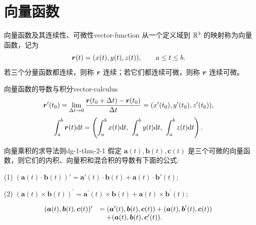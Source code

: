 \section{向量函数}

\begin{definition}{向量函数及其连续性、可微性}{vector-function}
从一个定义域到 $\mathbb{R}^3$ 的映射称为向量函数，记为
\[
\boldsymbol{r}(t)=(x(t),y(t),z(t)),\qquad a\leq t\leq b.
\]
若三个分量函数都连续，则称 $\boldsymbol{r}$ 连续；若它们都连续可微，则称 $\boldsymbol{r}$ 连续可微。
\end{definition}

\begin{definition}{向量函数的导数与积分}{vector-calculus}
\[
\boldsymbol{r}'(t_0)=\lim_{\Delta t\to0}
\frac{\boldsymbol{r}(t_0+\Delta t)-\boldsymbol{r}(t_0)}{\Delta t}
=(x'(t_0),y'(t_0),z'(t_0)),
\]
\[
\int_a^b\boldsymbol{r}(t)\mathrm{d} t=
\left(\int_a^b x(t)\mathrm{d} t,\ \int_a^b y(t)\mathrm{d} t,\ \int_a^b z(t)\mathrm{d} t\right).
\]
\end{definition}

\begin{theorem}{向量乘积的求导法则}{dg-1-thm-2-1}
假定  \(\boldsymbol{a}(t), \boldsymbol{b}(t), \boldsymbol{c}(t)\)  是三个可微的向量函数，则它们的内积、向量积和混合积的导数有下面的公式:\par

(1) \((\boldsymbol{a}(t)\cdot \boldsymbol{b}(t))' = \boldsymbol{a}'(t)\cdot \boldsymbol{b}(t) + \boldsymbol{a}(t)\cdot \boldsymbol{b}'(t);\)\par

(2) \((\boldsymbol{a}(t)\times \boldsymbol {b}(t))^{\prime} = \boldsymbol{a}^{\prime}(t)\times \boldsymbol {b}(t) + \boldsymbol {a}(t)\times \boldsymbol{b}^{\prime}(t);\)\par

\[
\begin{array}{r l} (\boldsymbol {a} (t), \boldsymbol {b} (t), \boldsymbol {c} (t)) ^ {\prime} & = (\boldsymbol {a} ^ {\prime} (t), \boldsymbol {b} (t), \boldsymbol {c} (t)) + (\boldsymbol {a} (t), \boldsymbol {b} ^ {\prime} (t), \boldsymbol {c} (t)) \\ & \quad + (\boldsymbol {a} (t), \boldsymbol {b} (t), \boldsymbol {c} ^ {\prime} (t)). \end{array}
\]
\end{theorem}


